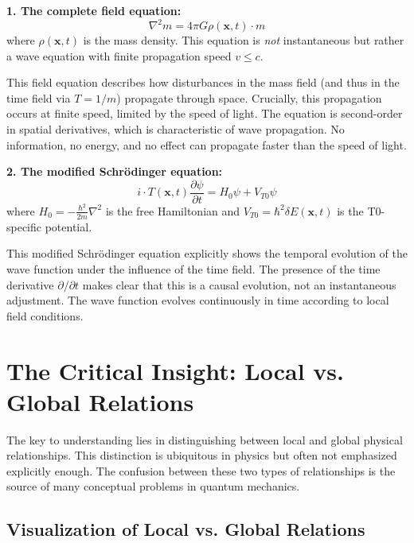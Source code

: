 \documentclass[12pt,a4paper]{article}
\begin{document}
	\textbf{1. The complete field equation:}
	\begin{equation}
		\nabla^2 m = 4\pi G \rho(\mathbf{x},t) \cdot m \label{eq:field_equation}
	\end{equation}
	where $\rho(\mathbf{x},t)$ is the mass density. This equation is \emph{not} instantaneous but rather a wave equation with finite propagation speed $v \leq c$.
	
	This field equation describes how disturbances in the mass field (and thus in the time field via $T = 1/m$) propagate through space. Crucially, this propagation occurs at finite speed, limited by the speed of light. The equation is second-order in spatial derivatives, which is characteristic of wave propagation. No information, no energy, and no effect can propagate faster than the speed of light.
	
	\textbf{2. The modified Schrödinger equation:}
	\begin{equation}
		i \cdot T(\mathbf{x},t) \frac{\partial \psi}{\partial t} = H_0 \psi + V_{T0} \psi \label{eq:schroedinger}
	\end{equation}
	where $H_0 = -\frac{\hbar^2}{2m}\nabla^2$ is the free Hamiltonian and $V_{T0} = \hbar^2 \delta E(\mathbf{x},t)$ is the T0-specific potential.
	
	This modified Schrödinger equation explicitly shows the temporal evolution of the wave function under the influence of the time field. The presence of the time derivative $\partial/\partial t$ makes clear that this is a causal evolution, not an instantaneous adjustment. The wave function evolves continuously in time according to local field conditions.
	
	\section{The Critical Insight: Local vs. Global Relations}
	
	The key to understanding lies in distinguishing between local and global physical relationships. This distinction is ubiquitous in physics but often not emphasized explicitly enough. The confusion between these two types of relationships is the source of many conceptual problems in quantum mechanics.
	
	\subsection{Visualization of Local vs. Global Relations}
	
\end{document}
